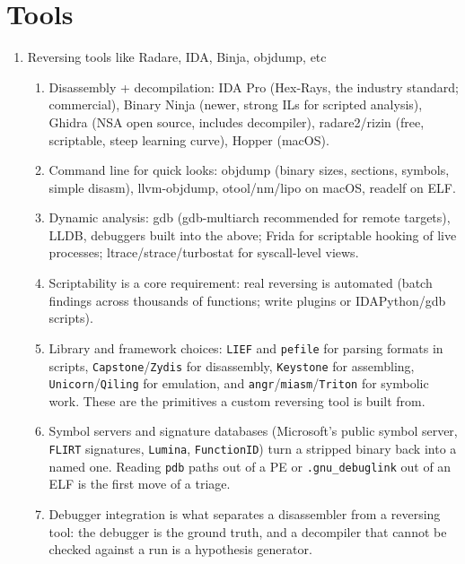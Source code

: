 \documentclass[12pt]{Training}
\begin{document}
\section*{Tools}
\begin{enumerate}
    \item Reversing tools like Radare, IDA, Binja, objdump, etc
    \begin{enumerate}
        \item Disassembly + decompilation: IDA Pro (Hex-Rays, the industry standard; commercial), Binary Ninja (newer, strong ILs for scripted analysis), Ghidra (NSA open source, includes decompiler), radare2/rizin (free, scriptable, steep learning curve), Hopper (macOS).
        \item Command line for quick looks: objdump (binary sizes, sections, symbols, simple disasm), llvm-objdump, otool/nm/lipo on macOS, readelf on ELF.
        \item Dynamic analysis: gdb (gdb-multiarch recommended for remote targets), LLDB, debuggers built into the above; Frida for scriptable hooking of live processes; ltrace/strace/turbostat for syscall-level views.
        \item Scriptability is a core requirement: real reversing is automated (batch findings across thousands of functions; write plugins or IDAPython/gdb scripts).
        \item Library and framework choices: \lstinline{LIEF} and \lstinline{pefile} for parsing formats in scripts, \lstinline{Capstone}/\lstinline{Zydis} for disassembly, \lstinline{Keystone} for assembling, \lstinline{Unicorn}/\lstinline{Qiling} for emulation, and \lstinline{angr}/\lstinline{miasm}/\lstinline{Triton} for symbolic work. These are the primitives a custom reversing tool is built from.
        \item Symbol servers and signature databases (Microsoft's public symbol server, \lstinline{FLIRT} signatures, \lstinline{Lumina}, \lstinline{FunctionID}) turn a stripped binary back into a named one. Reading \lstinline{pdb} paths out of a PE or \lstinline{.gnu_debuglink} out of an ELF is the first move of a triage.
        \item Debugger integration is what separates a disassembler from a reversing tool: the debugger is the ground truth, and a decompiler that cannot be checked against a run is a hypothesis generator.
    \end{enumerate}
\end{enumerate}

\end{document}
